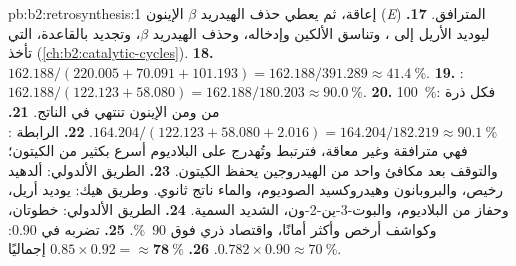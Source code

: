 \begin{solution}{pb:b2:retrosynthesis:1}
إعاقة، ثم يعطي حذف الهيدريد $\beta$ الإينون (\textit{E}) المترافق.
\textbf{17.}  ليوديد الأريل إلى ، وتناسق الألكين وإدخاله،
وحذف الهيدريد $\beta$، وتجديد  بالقاعدة، التي تأخذ 
(\cref{ch:b2:catalytic-cycles}).
\textbf{18.} $162.188/(220.005 + 70.091 + 101.193) = 162.188/391.289 \approx 41.4~\%$.
\textbf{19.} : $162.188/(122.123 + 58.080) = 162.188/180.203
\approx 90.0~\%$.
\textbf{20.} 100~\%: فكل ذرة من  ومن الإينون تنتهي في الناتج.
\textbf{21.} $164.204/(122.123 + 58.080 + 2.016) = 164.204/182.219 \approx 90.1~\%$.
\textbf{22.} الرابطة : فهي مترافقة وغير معاقة، فترتبط وتُهدرج على البلاديوم أسرع
بكثير من  الكيتون؛ والتوقف بعد مكافئ واحد من الهيدروجين يحفظ الكيتون.
\textbf{23.} الطريق الألدولي: ألدهيد رخيص، والبروبانون وهيدروكسيد الصوديوم، والماء ناتج ثانوي. وطريق
هيك: يوديد أريل، وحفاز من البلاديوم، والبوت-3-ين-2-ون، الشديد السمية.
\textbf{24.} الطريق الألدولي: خطوتان، وكواشف أرخص وأكثر أمانًا، واقتصاد ذري فوق 90~\%.
\textbf{25.} تضربه في 0.90: $0.782 \times 0.90 \approx 70~\%$.
\textbf{26.} $0.85 \times 0.92 = \boldsymbol{\approx 78~\%}$ إجماليًا.
\end{solution}
